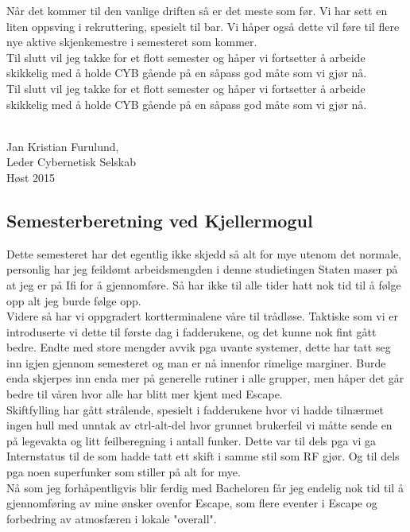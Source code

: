 \documentclass[16pt,norsk,a4paper]{article}
\begin{document}
Når det kommer til den vanlige driften så er det meste som før. Vi har sett en liten oppsving i rekruttering, spesielt til bar. Vi håper også dette vil føre til flere nye aktive skjenkemestre i semesteret som kommer.\\

Til slutt vil jeg takke for et flott semester og håper vi fortsetter å arbeide skikkelig med å holde CYB gående på en såpass god måte som vi gjør nå.\\

Til slutt vil jeg takke for et flott semester og håper vi fortsetter å arbeide skikkelig med å holde CYB gående på en såpass god måte som vi gjør nå.\\
\

Jan Kristian Furulund,\\
Leder Cybernetisk Selskab\\
Høst 2015



\subsection{Semesterberetning ved Kjellermogul}
Dette semesteret har det egentlig ikke skjedd så alt for mye utenom det normale,
personlig har jeg feildømt arbeidsmengden i denne studietingen Staten maser på at jeg er på Ifi for å gjennomføre.
Så har ikke til alle tider hatt nok tid til å følge opp alt jeg burde følge opp.\\

Videre så har vi oppgradert kortterminalene våre til trådløse. Taktiske som vi er introduserte vi dette til første dag i fadderukene, og det kunne nok fint gått bedre.
Endte med store mengder avvik pga uvante systemer, dette har tatt seg inn igjen gjennom semesteret og man er nå innenfor rimelige marginer.
Burde enda skjerpes inn enda mer på generelle rutiner i alle grupper, men håper det går bedre til våren hvor alle har blitt mer kjent med Escape.\\

Skiftfylling har gått strålende, spesielt i fadderukene hvor vi hadde tilnærmet ingen hull med unntak av ctrl-alt-del hvor grunnet brukerfeil vi måtte sende en
på legevakta og litt feilberegning i antall funker. Dette var til dels pga vi ga Internstatus til de som hadde tatt ett skift i samme stil som RF gjør.
Og til dels pga noen superfunker som stiller på alt for mye.\\

Nå som jeg forhåpentligvis blir ferdig med Bacheloren får jeg endelig nok tid til å gjennomføring av mine ønsker ovenfor Escape, som flere eventer i Escape
og forbedring av atmosfæren i lokale "overall".\\
\
\end{document}
